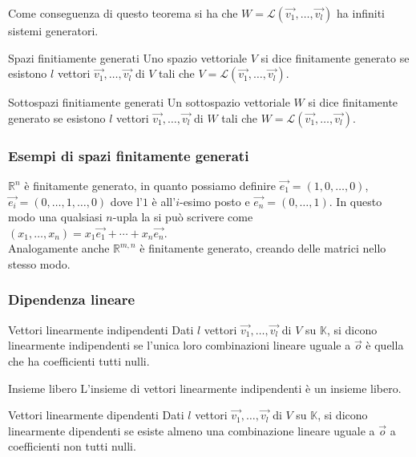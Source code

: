 Come conseguenza di questo teorema si ha che $W=\mathscr{L}(\vec{v_1},\ldots,\vec{v_l})$
ha infiniti sistemi generatori.

\begin{Def}{Spazi finitiamente generati}
  Uno spazio vettoriale $V$ si dice finitamente generato se esistono $l$ vettori
  $\vec{v_1},\ldots,\vec{v_l}$ di $V$ tali che $V=\mathscr{L}(\vec{v_1},\ldots,\vec{v_l}
  )$.
\end{Def}

\begin{Def}{Sottospazi finitiamente generati}
  Un sottospazio vettoriale $W$ si dice finitamente generato se esistono $l$ vettori
  $\vec{v_1},\ldots,\vec{v_l}$ di $W$ tali che $W=\mathscr{L}(\vec{v_1},\ldots,\vec{v_l}
  )$.
\end{Def}

\subsubsection{Esempi di spazi finitamente generati}%
\label{ssub:esempi_di_spazi_finitamente_generati}

$\mathbb{R}^n$ è finitamente generato, in quanto possiamo definire
$\vec{e_1}=(1,0,\ldots,0)$, $\vec{e_i}=(0,\ldots,1,\ldots,0)$ dove l'$1$ è all'$i$-esimo
posto e $\vec{e_n}=(0,\ldots,1)$. In questo modo una qualsiasi $n$-upla la si può
scrivere come $(x_1,\ldots,x_n)=x_1\vec{e_1}+\cdots+x_n\vec{e_n}$.\\
Analogamente anche $\mathbb{R}^{m,n}$ è finitamente generato, creando delle matrici
nello stesso modo.

\subsubsection{Dipendenza lineare}%
\label{sub:dipendenza_lineare}

\begin{Def}{Vettori linearmente indipendenti}
  Dati $l$ vettori $\vec{v_1},\ldots,\vec{v_l}$ di $V$ su $\mathbb{K}$, si dicono
  linearmente indipendenti se l'unica loro combinazioni lineare uguale a $\vec{o}$ è
  quella che ha coefficienti tutti nulli.
\end{Def}

\begin{SubDef}{Insieme libero}
  L'insieme di vettori linearmente indipendenti è un insieme libero.
\end{SubDef}

\begin{Def}{Vettori linearmente dipendenti}
  Dati $l$ vettori $\vec{v_1},\ldots,\vec{v_l}$ di $V$ su $\mathbb{K}$, si dicono
  linearmente dipendenti se esiste almeno una combinazione lineare uguale a $\vec{o}$ a
  coefficienti non tutti nulli.
\end{Def}

